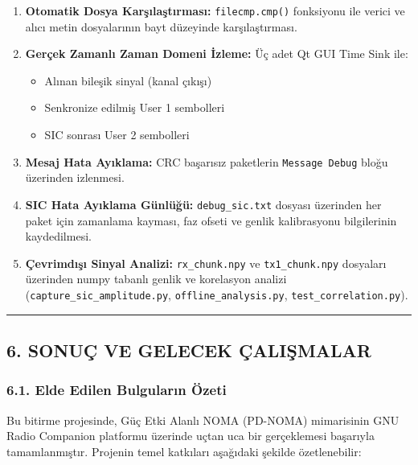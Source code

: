 \documentclass[
]{IEEEtran}
\providecommand{\tightlist}{%
  \setlength{\itemsep}{0pt}\setlength{\parskip}{0pt}}
\begin{document}
\begin{enumerate}
\def\labelenumi{\arabic{enumi}.}
\tightlist
\item
  \textbf{Otomatik Dosya Karşılaştırması:} \texttt{filecmp.cmp()}
  fonksiyonu ile verici ve alıcı metin dosyalarının bayt düzeyinde
  karşılaştırması.
\item
  \textbf{Gerçek Zamanlı Zaman Domeni İzleme:} Üç adet Qt GUI Time Sink
  ile:

  \begin{itemize}
  \tightlist
  \item
    Alınan bileşik sinyal (kanal çıkışı)
  \item
    Senkronize edilmiş User 1 sembolleri
  \item
    SIC sonrası User 2 sembolleri
  \end{itemize}
\item
  \textbf{Mesaj Hata Ayıklama:} CRC başarısız paketlerin
  \texttt{Message\ Debug} bloğu üzerinden izlenmesi.
\item
  \textbf{SIC Hata Ayıklama Günlüğü:} \texttt{debug\_sic.txt} dosyası
  üzerinden her paket için zamanlama kayması, faz ofseti ve genlik
  kalibrasyonu bilgilerinin kaydedilmesi.
\item
  \textbf{Çevrimdışı Sinyal Analizi:} \texttt{rx\_chunk.npy} ve
  \texttt{tx1\_chunk.npy} dosyaları üzerinden numpy tabanlı genlik ve
  korelasyon analizi (\texttt{capture\_sic\_amplitude.py},
  \texttt{offline\_analysis.py}, \texttt{test\_correlation.py}).
\end{enumerate}

\begin{center}\rule{0.5\linewidth}{0.5pt}\end{center}

\subsection{6. SONUÇ VE GELECEK
ÇALIŞMALAR}\label{sonuuxe7-ve-gelecek-uxe7aliux15fmalar}

\subsubsection{6.1. Elde Edilen Bulguların
Özeti}\label{elde-edilen-bulgularux131n-uxf6zeti}

Bu bitirme projesinde, Güç Etki Alanlı NOMA (PD-NOMA) mimarisinin GNU
Radio Companion platformu üzerinde uçtan uca bir gerçeklemesi başarıyla
tamamlanmıştır. Projenin temel katkıları aşağıdaki şekilde
özetlenebilir:
\end{document}
